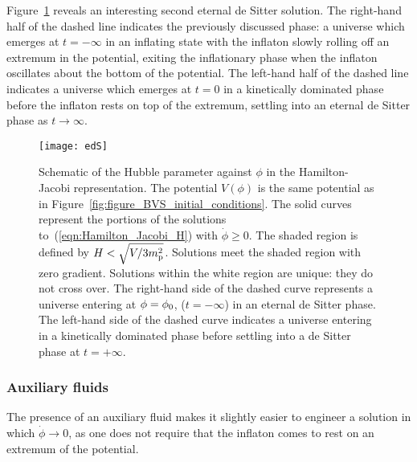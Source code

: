 Figure~\ref{fig:figure_edS} reveals an interesting second eternal de Sitter solution. The right-hand half of the dashed line indicates the previously discussed phase: a universe which emerges at $t=-\infty$ in an inflating state with the inflaton slowly rolling off an extremum in the potential, exiting the inflationary phase when the inflaton oscillates about the bottom of the potential.  The left-hand half of the dashed line indicates a universe which emerges at $t=0$ in a kinetically dominated phase before the inflaton rests on top of the extremum, settling into an eternal de Sitter phase as $t\to\infty$.

%
\begin{figure}
  \texttt{[image: edS]}
  \caption{Schematic of the Hubble parameter against $\phi$ in the Hamilton-Jacobi representation. The potential $V(\phi)$ is the same potential as in Figure~\protect\ref{fig:figure_BVS_initial_conditions}. The solid curves represent the portions of the solutions to~\protect(\ref{eqn:Hamilton_Jacobi_H}) with $\dot{\phi}\ge0$. The shaded region is defined by $H<\sqrt{V/3m_{\mathrm{p}}^2}$. Solutions meet the shaded region with zero gradient. Solutions within the white region are unique: they do not cross over. The right-hand side of the dashed curve represents a universe entering at  $\phi=\phi_0$, ($t=-\infty$) in an eternal de Sitter phase. The left-hand side of the dashed curve indicates a universe entering in a kinetically dominated phase before settling into a de Sitter phase at $t=+\infty$.
  }
  \label{fig:figure_edS}
\end{figure}
%

\subsubsection{Auxiliary fluids}
The presence of an auxiliary fluid makes it slightly easier to engineer a solution in which $\dot\phi\to0$, as one does not require that the inflaton comes to rest on an extremum of the potential.

